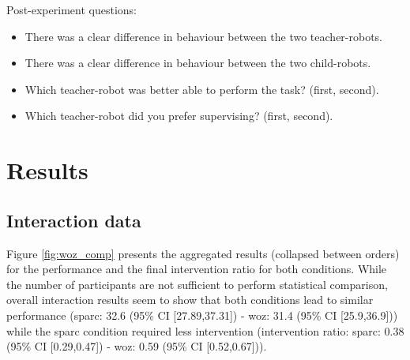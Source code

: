 Post-experiment questions:
\begin{itemize}
	\item There was a clear difference in behaviour between the two teacher-robots.
	\item There was a clear difference in behaviour between the two child-robots.
	\item Which teacher-robot was better able to perform the task? (first, second).
	\item Which teacher-robot did you prefer supervising? (first, second).
\end{itemize}

\section{Results}

\subsection{Interaction data}

Figure \ref{fig:woz_comp} presents the aggregated results (collapsed between orders) for the performance and the final intervention ratio for both conditions. While the number of participants are not sufficient to perform statistical comparison, overall interaction results seem to show that both conditions lead to similar performance (\gls{sparc}: 32.6 (95\% CI [27.89,37.31]) - \gls{woz}: 31.4 (95\% CI [25.9,36.9])) while the \gls{sparc} condition required less intervention (intervention ratio: \gls{sparc}: 0.38 (95\% CI [0.29,0.47]) - \gls{woz}: 0.59 (95\% CI [0.52,0.67])). 

